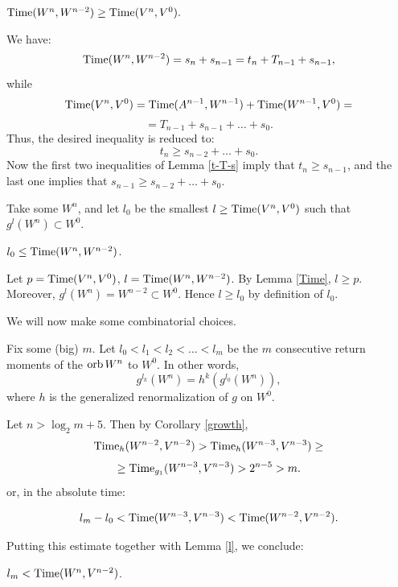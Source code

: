 \begin{lem}\label{Time}
    $\operatorname{Time} (W^n,W^{n-2}) \geq \operatorname{Time} (V^n,V^0). $
\end{lem}

\begin{pf}
  We have:   
$$
  \operatorname{Time} (W^n,W^{n-2}) = s_n+s_{n-1}= t_n+T_{n-1}+s_{n-1},
$$
while
$$
   \operatorname{Time} (V^n,V^0) = \operatorname{Time}(A^{n-1}, W^{n-1})+ \operatorname{Time}(W^{n-1},V^0) =
$$ 
$$ 
   = T_{n-1} + s_{n-1}+\dots + s_0 .
$$ 
   Thus, the desired inequality is reduced to:
$$
  t_n \geq s_{n-2}+\dots + s_0.
$$
Now the first two inequalities of Lemma \ref{t-T-s} imply that $t_n\geq s_{n-1}$,
and the last one implies that $s_{n-1} \geq s_{n-2}+\dots + s_0 .$

\end{pf}


  Take some $W^n$, and let $l_0$ be the smallest $l\geq \operatorname{Time}(V^n, V^0)$ such that
$g^l (W^n)\subset W^0$. 

\begin{lem}\label{l}
  $l_0\leq \operatorname{Time}(W^n, W^{n-2})$.
\end{lem}

\begin{pf}
  Let $p=\operatorname{Time}(V^n, V^0)$, $l=\operatorname{Time}(W^n, W^{n-2})$. 
By Lemma \ref{Time}, $l \geq p$. Moreover, $g^l (W^n)= W^{n-2}\subset W^0$.
Hence $l\geq l_0$ by definition of $l_0$. 
\end{pf}

We will now make some combinatorial choices.

Fix some (big) $m$. 
Let  $l_0< l_1< l_2<\dots<l_m $ be the $m$ consecutive return moments of the $\operatorname{orb} W^n$ to $W^0$.
In other words, 
$$
   g^{l_k}(W^n) = h^k (g^{l_0}(W^n)),
$$ 
where $h$ is the generalized renormalization of $g$  on $W^0$.  

Let $n> \log_2 m +5$. 
Then by Corollary \ref{growth}, 
\begin{equation}\label{rel}
       \operatorname{Time}_h (W^{n-2}, V^{n-2}) >   \operatorname{Time}_h (W^{n-3}, V^{n-3}) \geq 
\end{equation}
$$
                \geq \operatorname{Time}_{g_1} (W^{n-3}, V^{n-3}) >  2^{n-5} > m.
$$
or, in the absolute time: 

\begin{equation}\label{absolute}
   l_m - l_0 < \operatorname{Time}(W^{n-3}, V^{n-3}) <  \operatorname{Time} (W^{n-2}, V^{n-2}). 
\end{equation}

Putting this estimate together with  Lemma \ref{l}, we conclude:

\begin{lem}\label{last moment}
  $l_m < \operatorname{Time} (W^n, V^{n-2})$.
\end{lem}

